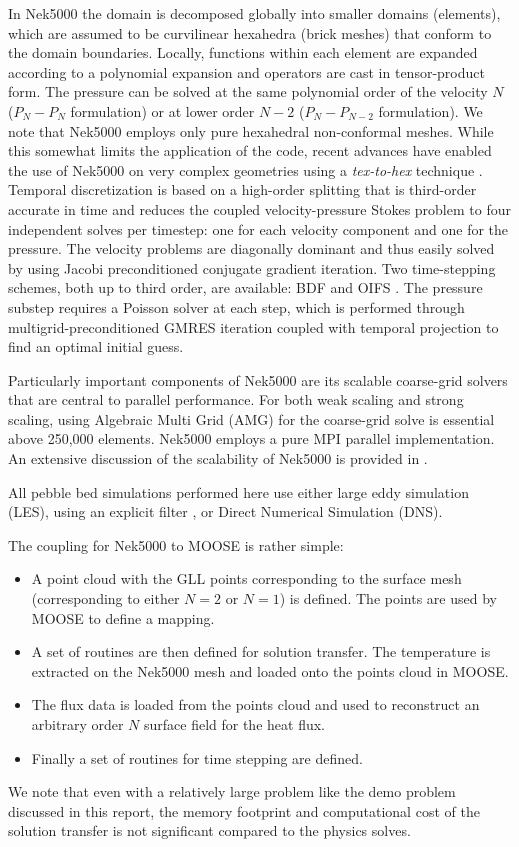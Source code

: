In Nek5000 the domain is decomposed globally into smaller domains (elements), which are assumed
to be curvilinear hexahedra (brick meshes) that conform to the domain boundaries. Locally, functions within
each element are expanded according to a polynomial expansion and operators are cast in tensor-product
form. The pressure can be solved at the same polynomial order of the velocity $N$ ($P_{N} - P_{N}$ formulation)
or at lower order $N-2$ ($P_{N} - P_{N-2}$ formulation). We note that Nek5000 employs only pure hexahedral
non-conformal meshes. While this somewhat limits the application of the code, recent advances have enabled the use of Nek5000 on very complex geometries using a \textit{tex-to-hex} technique \cite{yuan2020spectral}.
Temporal discretization is based on a high-order splitting that is third-order accurate in time and
reduces the coupled velocity-pressure Stokes problem to four independent solves per timestep: one for each
velocity component and one for the pressure. The velocity problems are diagonally dominant and thus easily
solved by using Jacobi preconditioned conjugate gradient iteration. Two time-stepping schemes, both up to
third order, are available: BDF and OIFS \cite{fischer2003implementation}. The pressure substep requires a Poisson solver at each step,
which is performed through multigrid-preconditioned GMRES iteration coupled with temporal projection to find an optimal initial guess.

Particularly important components of Nek5000 are its scalable coarse-grid solvers that are central to
parallel performance. For both weak scaling and strong scaling, using Algebraic Multi Grid (AMG) for the
coarse-grid solve is essential above 250,000 elements. Nek5000 employs a pure MPI parallel implementation.
An extensive discussion of the scalability of Nek5000 is provided in \cite{offermans2016strong}.

All pebble bed simulations performed here use either large eddy simulation (LES), using an explicit filter \cite{fischer2001filter}, or Direct Numerical Simulation (DNS).

The coupling for Nek5000 to MOOSE is rather simple:
\begin{itemize}
\item A point cloud with the GLL points corresponding to the surface mesh (corresponding to either $N = 2$ or $N = 1$) is defined. The points are used by MOOSE to define a mapping.
\item A set of routines are then defined for solution transfer. The temperature is extracted on the Nek5000 mesh and loaded onto the points cloud in MOOSE.
\item The flux data is loaded from the points cloud and  used to reconstruct an arbitrary order $N$ surface field for the heat
flux.
\item Finally a set of routines for time stepping are defined.
\end{itemize}
We note that even with a relatively large problem like the demo problem discussed in this report, the memory footprint and computational cost of the solution transfer is not significant compared to the physics solves.

